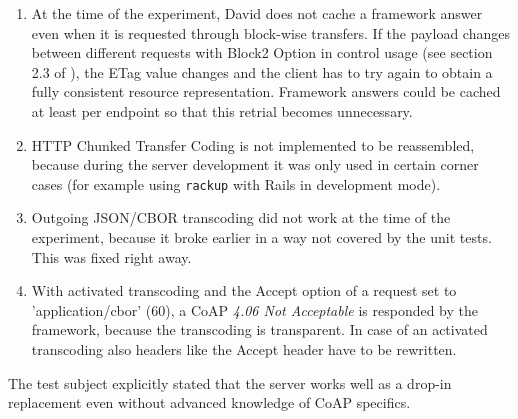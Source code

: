 		\begin{enumerate}
			\item At the time of the experiment, David does not cache a
				framework answer even when it is requested through block-wise
				transfers. If the payload changes between different requests
				with Block2 Option in control usage (see section 2.3 of
				\cite{block}), the ETag value changes and the client has to try
				again to obtain a fully consistent resource representation.
				Framework answers could be cached at least per endpoint so that
				this retrial becomes unnecessary.
			\item \ac{HTTP} Chunked Transfer Coding is not implemented to be
				reassembled, because during the server development it was only
				used in certain corner cases (for example using \texttt{rackup}
				with \ac{Rails} in development mode).
			\item Outgoing \ac{JSON}/\ac{CBOR} transcoding did not work at the
				time of the experiment, because it broke earlier in a way not
				covered by the unit tests. This was fixed right away.
			\item With activated transcoding and the Accept option of a request
				set to 'application/cbor' (60), a \ac{CoAP} \emph{4.06 Not
				Acceptable} is responded by the framework, because the
				transcoding is transparent. In case of an activated transcoding
				also headers like the Accept header have to be rewritten.
		\end{enumerate}

		The test subject explicitly stated that the server works well as a
		drop-in replacement even without advanced knowledge of \ac{CoAP}
		specifics.

